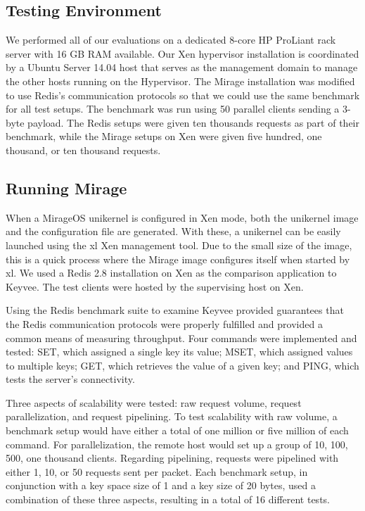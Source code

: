 \documentclass[english,10pt,twocolumn]{article}
\begin{document}
\subsection{Testing Environment}
We performed all of our evaluations on a dedicated 8-core HP ProLiant rack server with 16 GB RAM available.
Our Xen hypervisor installation is coordinated by a Ubuntu Server 14.04 host that serves as the management domain to manage the other hosts running on the Hypervisor.
The Mirage installation was modified to use Redis's communication protocols so that we could use the same benchmark for all test setups. The benchmark was run using 50 parallel clients sending a 3-byte payload.
The Redis setups were given ten thousands requests as part of their benchmark, while the Mirage setups on Xen were given five hundred, one thousand, or ten thousand requests.

\subsection{Running Mirage}


When a MirageOS unikernel is configured in Xen mode, both the unikernel image and the configuration file are generated.
With these, a unikernel can be easily launched using the xl Xen management tool.
Due to the small size of the image, this is a quick process where the Mirage image configures itself when started by xl.
We used a Redis 2.8 installation on Xen as the comparison application to Keyvee.
The test clients were hosted by the supervising host on Xen.

Using the Redis benchmark suite to examine Keyvee provided guarantees that the Redis communication protocols were properly fulfilled and provided a common means of measuring throughput.
Four commands were implemented and tested: SET, which assigned a single key its value; MSET, which assigned values to multiple keys; GET, which retrieves the value of a given key; and PING, which tests the server's connectivity.

Three aspects of scalability were tested: raw request volume, request parallelization, and request pipelining.
To test scalability with raw volume, a benchmark setup would have either a total of one million or five million of each command.
For parallelization, the remote host would set up a group of 10, 100, 500, one thousand clients.
Regarding pipelining, requests were pipelined with either 1, 10, or 50 requests sent per packet.
Each benchmark setup, in conjunction with a key space size of 1 and a key size of 20 bytes, used a combination of these three aspects, resulting in a total of 16 different tests.
\end{document}
